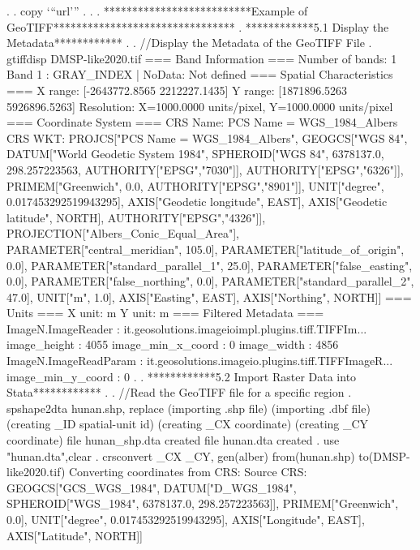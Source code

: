 .                                 
.         copy `"`url'"' .
. {\rbr}
{\smallskip}
. **************************Example of GeoTIFF********************************
. ************5.1 Display the Metadata************
. 
. //Display the Metadata of the GeoTIFF File
. gtiffdisp DMSP-like2020.tif
{\smallskip}
=== Band Information ===
Number of bands: 1
Band 1 : GRAY_INDEX           | NoData: Not defined
{\smallskip}
=== Spatial Characteristics ===
X range: [-2643772.8565 {\tytilde} 2212227.1435]
Y range: [1871896.5263 {\tytilde} 5926896.5263]
Resolution: X=1000.0000 units/pixel, Y=1000.0000 units/pixel
{\smallskip}
=== Coordinate System ===
CRS Name: PCS Name = WGS_1984_Albers
CRS WKT: PROJCS["PCS Name = WGS_1984_Albers", 
  GEOGCS["WGS 84", 
    DATUM["World Geodetic System 1984", 
      SPHEROID["WGS 84", 6378137.0, 298.257223563, AUTHORITY["EPSG","7030"]], 
      AUTHORITY["EPSG","6326"]], 
    PRIMEM["Greenwich", 0.0, AUTHORITY["EPSG","8901"]], 
    UNIT["degree", 0.017453292519943295], 
    AXIS["Geodetic longitude", EAST], 
    AXIS["Geodetic latitude", NORTH], 
    AUTHORITY["EPSG","4326"]], 
  PROJECTION["Albers_Conic_Equal_Area"], 
  PARAMETER["central_meridian", 105.0], 
  PARAMETER["latitude_of_origin", 0.0], 
  PARAMETER["standard_parallel_1", 25.0], 
  PARAMETER["false_easting", 0.0], 
  PARAMETER["false_northing", 0.0], 
  PARAMETER["standard_parallel_2", 47.0], 
  UNIT["m", 1.0], 
  AXIS["Easting", EAST], 
  AXIS["Northing", NORTH]]
{\smallskip}
=== Units ===
X unit: m
Y unit: m
{\smallskip}
=== Filtered Metadata ===
ImageN.ImageReader          : it.geosolutions.imageioimpl.plugins.tiff.TIFFIm...
image_height                : 4055
image_min_x_coord           : 0
image_width                 : 4856
ImageN.ImageReadParam       : it.geosolutions.imageio.plugins.tiff.TIFFImageR...
image_min_y_coord           : 0
{\smallskip}
. 
. ************5.2 Import Raster Data into Stata************
. 
. //Read the GeoTIFF file for a specific region
. spshape2dta hunan.shp, replace 
  (importing .shp file)
  (importing .dbf file)
  (creating _ID spatial-unit id)
  (creating _CX coordinate)
  (creating _CY coordinate)
{\smallskip}
  file hunan_shp.dta created
  file hunan.dta     created
{\smallskip}
. use "hunan.dta",clear
{\smallskip}
. crsconvert _CX _CY, gen(alber) from(hunan.shp) to(DMSP-like2020.tif)
Converting coordinates from CRS:
Source CRS: GEOGCS["GCS_WGS_1984", 
  DATUM["D_WGS_1984", 
    SPHEROID["WGS_1984", 6378137.0, 298.257223563]], 
  PRIMEM["Greenwich", 0.0], 
  UNIT["degree", 0.017453292519943295], 
  AXIS["Longitude", EAST], 
  AXIS["Latitude", NORTH]]
